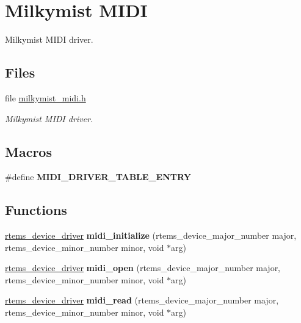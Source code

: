 \hypertarget{group__lm32__milkymist__midi}{}\section{Milkymist M\+I\+DI}
\label{group__lm32__milkymist__midi}


Milkymist M\+I\+DI driver.  


\subsection*{Files}
\begin{DoxyCompactItemize}
\item 
file \mbox{\hyperlink{milkymist__midi_8h}{milkymist\+\_\+midi.\+h}}
\begin{DoxyCompactList}\small\item\em Milkymist M\+I\+DI driver. \end{DoxyCompactList}\end{DoxyCompactItemize}
\subsection*{Macros}
\begin{DoxyCompactItemize}
\item 
\#define {\bfseries M\+I\+D\+I\+\_\+\+D\+R\+I\+V\+E\+R\+\_\+\+T\+A\+B\+L\+E\+\_\+\+E\+N\+T\+RY}
\end{DoxyCompactItemize}
\subsection*{Functions}
\begin{DoxyCompactItemize}
\item 
\mbox{\label{group__lm32__milkymist__midi_gaba76392387639e5e856b5688b41433ef}} 
\mbox{\hyperlink{group__ClassicStatus_ga545d41846817eaba6143d52ee4d9e9fe}{rtems\+\_\+device\+\_\+driver}} {\bfseries midi\+\_\+initialize} (rtems\+\_\+device\+\_\+major\+\_\+number major, rtems\+\_\+device\+\_\+minor\+\_\+number minor, void $\ast$arg)
\item 
\mbox{\label{group__lm32__milkymist__midi_gaa4d36d1d21efddae0f030bcb8ebb7a7d}} 
\mbox{\hyperlink{group__ClassicStatus_ga545d41846817eaba6143d52ee4d9e9fe}{rtems\+\_\+device\+\_\+driver}} {\bfseries midi\+\_\+open} (rtems\+\_\+device\+\_\+major\+\_\+number major, rtems\+\_\+device\+\_\+minor\+\_\+number minor, void $\ast$arg)
\item 
\mbox{\label{group__lm32__milkymist__midi_ga768fed4768eae877c3ef73d02b911717}} 
\mbox{\hyperlink{group__ClassicStatus_ga545d41846817eaba6143d52ee4d9e9fe}{rtems\+\_\+device\+\_\+driver}} {\bfseries midi\+\_\+read} (rtems\+\_\+device\+\_\+major\+\_\+number major, rtems\+\_\+device\+\_\+minor\+\_\+number minor, void $\ast$arg)
\end{DoxyCompactItemize}


